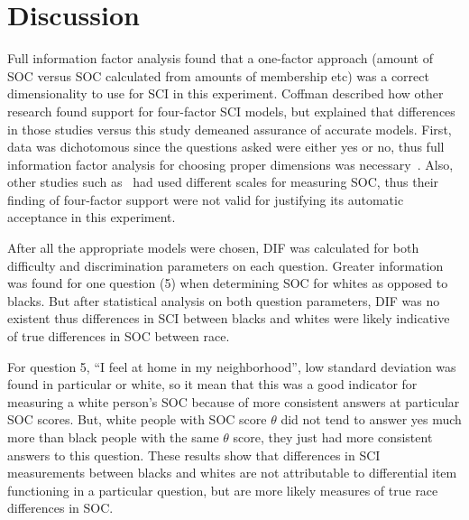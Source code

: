 \documentclass{sig-alternate}
\begin{document}
\section{Discussion}
\label{sec:discussion}
Full information factor analysis found that a one-factor approach (amount of SOC versus SOC calculated from amounts of membership etc) was a correct dimensionality to use for SCI in this experiment. Coffman described how other research found support for four-factor SCI models, but explained that differences in those studies versus this study demeaned assurance of accurate models. First, data was dichotomous since the questions asked were either yes or no, thus full information factor analysis for choosing proper dimensions was necessary~\cite{disparities:2009}. Also, other studies such as~\cite{validation:2008} had used different scales for measuring SOC, thus their finding of four-factor support were not valid for justifying its automatic acceptance in this experiment. 

After all the appropriate models were chosen, DIF was calculated for both difficulty and discrimination parameters on each question. Greater information was found for one question (5) when determining SOC for whites as opposed to blacks. But after statistical analysis on both question parameters, DIF was no existent thus differences in SCI between blacks and whites were likely indicative of true differences in SOC between race. 

For question 5, ``I feel at home in my neighborhood'', low standard deviation was found in particular or white, so it mean that this was a good indicator for measuring a white person's SOC because of more consistent answers at particular SOC scores. But, white people with SOC score $\theta$ did not tend to answer yes much more than black people with the same $\theta$ score, they just had more consistent answers to this question. These results show that differences in SCI measurements between blacks and whites are not attributable to differential item functioning in a particular question, but are more likely measures of true race differences in SOC. 

\nocite{*}



\end{document}
